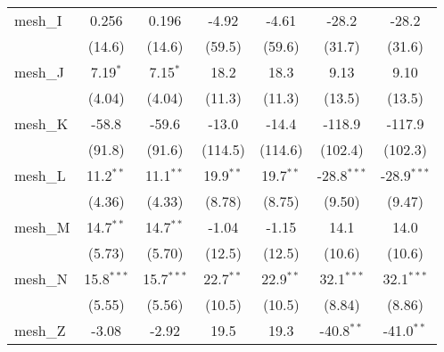 \begin{tabular}{lcccccc}
   mesh\_I                                                     & 0.256          & 0.196          & -4.92         & -4.61         & -28.2         & -28.2\\   
                                                               & (14.6)         & (14.6)         & (59.5)        & (59.6)        & (31.7)        & (31.6)\\   
   mesh\_J                                                     & 7.19$^{*}$     & 7.15$^{*}$     & 18.2          & 18.3          & 9.13          & 9.10\\   
                                                               & (4.04)         & (4.04)         & (11.3)        & (11.3)        & (13.5)        & (13.5)\\   
   mesh\_K                                                     & -58.8          & -59.6          & -13.0         & -14.4         & -118.9        & -117.9\\   
                                                               & (91.8)         & (91.6)         & (114.5)       & (114.6)       & (102.4)       & (102.3)\\   
   mesh\_L                                                     & 11.2$^{**}$    & 11.1$^{**}$    & 19.9$^{**}$   & 19.7$^{**}$   & -28.8$^{***}$ & -28.9$^{***}$\\   
                                                               & (4.36)         & (4.33)         & (8.78)        & (8.75)        & (9.50)        & (9.47)\\   
   mesh\_M                                                     & 14.7$^{**}$    & 14.7$^{**}$    & -1.04         & -1.15         & 14.1          & 14.0\\   
                                                               & (5.73)         & (5.70)         & (12.5)        & (12.5)        & (10.6)        & (10.6)\\   
   mesh\_N                                                     & 15.8$^{***}$   & 15.7$^{***}$   & 22.7$^{**}$   & 22.9$^{**}$   & 32.1$^{***}$  & 32.1$^{***}$\\   
                                                               & (5.55)         & (5.56)         & (10.5)        & (10.5)        & (8.84)        & (8.86)\\   
   mesh\_Z                                                     & -3.08          & -2.92          & 19.5          & 19.3          & -40.8$^{**}$  & -41.0$^{**}$\\   

\end{tabular}
